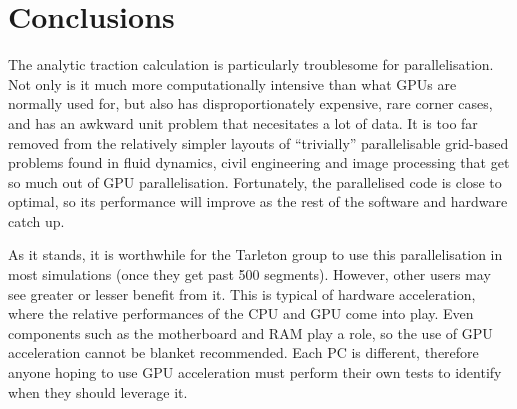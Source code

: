 \section{Conclusions}

The analytic traction calculation is particularly troublesome for parallelisation. Not only is it much more computationally intensive than what GPUs are normally used for, but also has disproportionately expensive, rare corner cases, and has an awkward unit problem that necesitates a lot of data. It is too far removed from the relatively simpler layouts of ``trivially'' parallelisable grid-based problems found in fluid dynamics, civil engineering and image processing that get so much out of GPU parallelisation. Fortunately, the parallelised code is close to optimal, so its performance will improve as the rest of the software and hardware catch up.

As it stands, it is worthwhile for the Tarleton group to use this parallelisation in most simulations (once they get past 500 segments). However, other users may see greater or lesser benefit from it. This is typical of hardware acceleration, where the relative performances of the CPU and GPU come into play. Even components such as the motherboard and RAM play a role, so the use of GPU acceleration cannot be blanket recommended. Each PC is different, therefore anyone hoping to use GPU acceleration must perform their own tests to identify when they should leverage it.
\savearabiccounter

